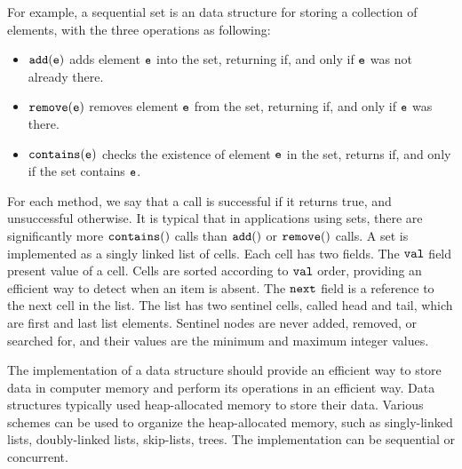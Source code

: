 For example,  a sequential set is an data structure for storing a collection of elements, with the three operations as following: 
\begin{itemize}
\item $\tt add(e)$ adds element $\tt e$ into the set, returning \true\; if, and only if $\tt e$ was not
already there. 
\item $\tt remove(e)$ removes element $\tt e$ from the set, returning \true\; if, and only if
$\tt e$ was there. 
\item $\tt contains(e)$ checks the existence of element $\tt e$ in the set, returns \true\; if, and only if the set contains $\tt e$. 
\end{itemize}
For each method, we say that a call is successful if it returns true, and unsuccessful
otherwise. It is typical that in applications using sets, there are significantly more
$\tt contains()$ calls than $\tt add()$ or $\tt remove()$ calls.
A set is implemented as a singly linked list of cells. Each cell has two fields. The $\tt val$ field present value of a cell. Cells are sorted according to $\tt val$ order, providing an efficient way to detect when an item is absent. The $\tt next$ field is a reference to
the next cell in the list. The list has two sentinel cells, called head and tail, which are first and last list elements. Sentinel nodes are never added, removed, or searched for, and their values are the minimum and maximum integer values.

The implementation of a data structure should provide
an efficient way to store data in computer memory and perform its operations
in an efficient way. Data structures
typically used heap-allocated memory to store their data. Various schemes
can be used to organize the heap-allocated memory, such as singly-linked lists,
doubly-linked lists, skip-lists, trees. The implementation
can be sequential or concurrent.


